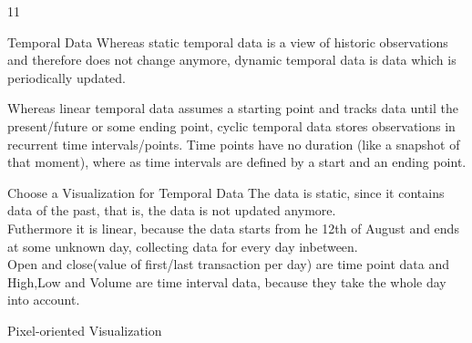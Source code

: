 \documentclass{article}
\begin{document}
    \begin{ukon-infie}[31.01.18]{11}

        \begin{exercise}[p=3]{Temporal Data}  
        \question{}
        {
        Whereas static temporal data is a view of historic observations and therefore does not change anymore, dynamic temporal data is data which is periodically updated.
      	}
      	
      	\question{}
      	{
      	Whereas linear temporal data assumes a starting point and tracks data until the present/future or some ending point, cyclic temporal data stores observations in recurrent time intervals/points.
      	}
      	\question{}
      	{
      	Time points have no duration (like a snapshot of that moment), where as time intervals are defined by a start and an ending point.
      	}
		\end{exercise}
		
		
		\begin{exercise}[p=7]{Choose a Visualization for Temporal Data}
		\question{}
		{
		The data is static, since it contains data of the past, that is, the data is not updated anymore.\\
		Futhermore it is linear, because the data starts from he 12th of August and ends at some unknown day, collecting data for every day inbetween.\\
		Open and close(value of first/last transaction per day) are time point data and High,Low and Volume are time interval data, because they take the whole day into account.
		}
		\question{}
		{
		}
		\end{exercise}
		
		\begin{exercise}[p=4]{Pixel-oriented Visualization}
		
		\end{exercise}
		
		
\end{ukon-infie}
\end{document}
